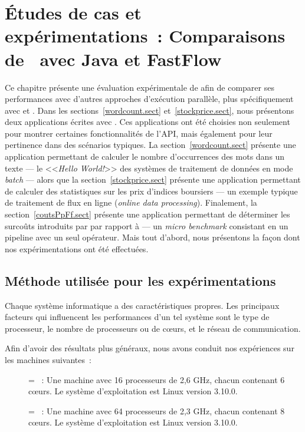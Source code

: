
\chapter{\'Etudes de cas et exp\'erimentations~: Comparaisons de \ppff\ avec Java et FastFlow}
\label{experiences.chap}


Ce chapitre pr\'esente une \'evaluation exp\'erimentale de  afin de comparer ses performances avec d'autres approches d'ex\'ecution parall\`ele, plus sp\'ecifiquement avec  et .
%
Dans les sections~\ref{wordcount.sect} et~\ref{stockprice.sect}, nous pr\'esentons deux applications \'ecrites avec \PpFf. Ces applications ont \'et\'e choisies non seulement pour montrer certaines fonctionnalit\'es de l'API, mais \'egalement pour leur pertinence dans des sc\'enarios typiques. La section~\ref{wordcount.sect} pr\'esente une application permettant de calculer le nombre d'occurrences des mots dans un texte --- le <<\emph{Hello World!}>> des syst\`emes de traitement de donn\'ees en mode \emph{batch} --- alors que la section~\ref{stockprice.sect} pr\'esente une application permettant de calculer des statistiques sur les prix d'indices boursiers --- un exemple typique de traitement de flux en ligne (\emph{online data processing}). Finalement, la section~\ref{coutsPpFf.sect} pr\'esente une application permettant de d\'eterminer les surco\^uts introduits par  par rapport \`a  --- un \emph{micro benchmark} consistant en un pipeline avec un seul op\'erateur. Mais tout d'abord, nous pr\'esentons la fa\c{c}on dont nos exp\'erimentations ont \'et\'e effectu\'ees.

\section{M\'ethode utilis\'ee pour les exp\'erimentations}
\label{usedMethodsForBenchmarks.chap}

Chaque syst\`eme informatique a des caract\'eristiques propres. Les principaux facteurs qui influencent les performances d'un tel syst\`eme sont le type de processeur, le nombre de processeurs ou de c\oe{}urs, et le r\'eseau de communication. 



\goodbreak
\begin{samepage}
Afin d'avoir des r\'esultats plus g\'en\'eraux, nous avons conduit nos exp\'eriences sur les machines suivantes~:
\label{machines.sect}


\begin{description}
\item[] = ~: Une machine avec 16 processeurs de 2,6 GHz, chacun contenant 6 cœurs. Le syst\`eme d'exploitation est Linux version 3.10.0. 


\item[] = ~:  Une machine avec 64 processeurs de 2,3 GHz, chacun contenant 8 cœurs. Le système d'exploitation est Linux version 3.10.0.


\end{description}
\end{samepage}

